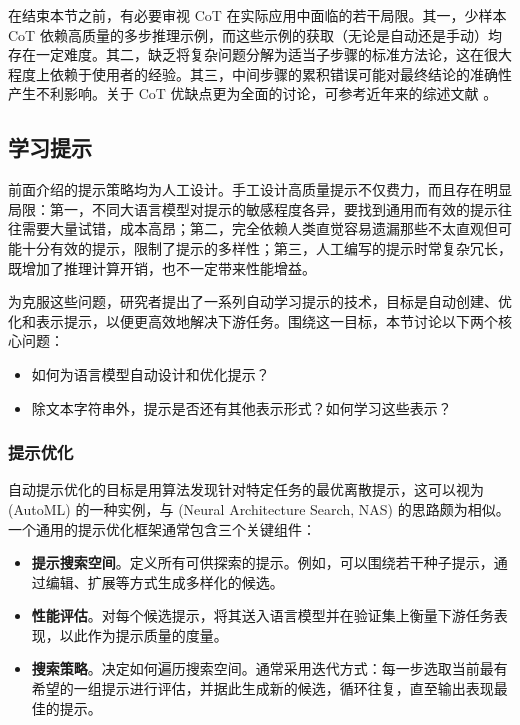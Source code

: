 在结束本节之前，有必要审视 CoT 在实际应用中面临的若干局限。其一，少样本 CoT 依赖高质量的多步推理示例，而这些示例的获取（无论是自动还是手动）均存在一定难度。其二，缺乏将复杂问题分解为适当子步骤的标准方法论，这在很大程度上依赖于使用者的经验。其三，中间步骤的累积错误可能对最终结论的准确性产生不利影响。关于 CoT 优缺点更为全面的讨论，可参考近年来的综述文献 \cite{chu-etal:2023survey,yu-etal:2023towards,zhang-etal:2023igniting}。
\subsection{学习提示}
\label{sec:learning-prompts}

\noindent 前面介绍的提示策略均为人工设计。手工设计高质量提示不仅费力，而且存在明显局限：第一，不同大语言模型对提示的敏感程度各异，要找到通用而有效的提示往往需要大量试错，成本高昂；第二，完全依赖人类直觉容易遗漏那些不太直观但可能十分有效的提示，限制了提示的多样性；第三，人工编写的提示时常复杂冗长，既增加了推理计算开销，也不一定带来性能增益。

为克服这些问题，研究者提出了一系列自动学习提示的技术，目标是自动创建、优化和表示提示，以便更高效地解决下游任务。围绕这一目标，本节讨论以下两个核心问题：

\begin{itemize}
\item 如何为语言模型自动设计和优化提示？
\item 除文本字符串外，提示是否还有其他表示形式？如何学习这些表示？
\end{itemize}

\subsubsection{提示优化}
\label{sec:prompt-optimization}

\noindent 自动提示优化的目标是用算法发现针对特定任务的最优离散提示，这可以视为 (AutoML) 的一种实例，与 (Neural Architecture Search, NAS) 的思路颇为相似。一个通用的提示优化框架通常包含三个关键组件：

\begin{itemize}
\item \textbf{提示搜索空间}。定义所有可供探索的提示。例如，可以围绕若干种子提示，通过编辑、扩展等方式生成多样化的候选。
\item \textbf{性能评估}。对每个候选提示，将其送入语言模型并在验证集上衡量下游任务表现，以此作为提示质量的度量。
\item \textbf{搜索策略}。决定如何遍历搜索空间。通常采用迭代方式：每一步选取当前最有希望的一组提示进行评估，并据此生成新的候选，循环往复，直至输出表现最佳的提示。
\end{itemize}

